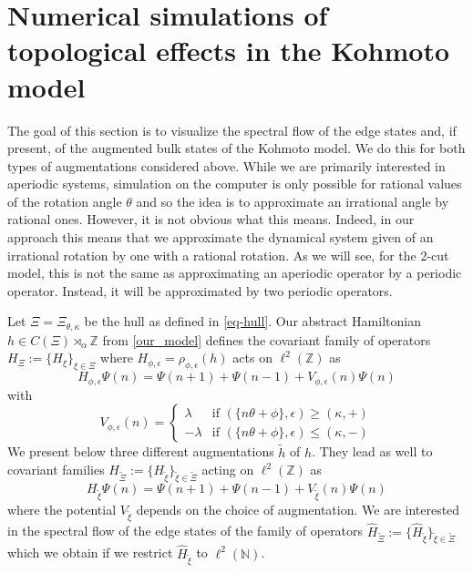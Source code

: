 \documentclass[11pt]{amsart}
\newcommand{\Z}{\mathbb{Z}}
\newcommand{\N}{\mathbb{N}}
\newcommand{\cut}{\kappa}
\begin{document}
\section{Numerical simulations of topological effects in the Kohmoto model}
\label{numerical_simulations}
The goal of this section is to visualize the spectral flow of the edge states and, if present, of the augmented bulk states of the Kohmoto model. We do this for both types of augmentations considered above. While we are primarily interested in aperiodic systems, simulation on the computer is only possible for rational values of the rotation angle $\theta$ 
and so the idea is to approximate an irrational angle by rational ones. However, it is not obvious what this means. Indeed, in our approach this means that we approximate the dynamical system given of an irrational rotation by one with a rational rotation. As we will see, for the 2-cut model, this is not the same as approximating an aperiodic operator by a periodic operator. Instead, it will be approximated by two periodic operators.
 
Let $\Xi = \Xi_{\theta,\cut}$ be the hull as defined in \eqref{eq-hull}. Our abstract Hamiltonian $h\in C(\Xi)\rtimes_\alpha\Z$ from \eqref{our_model} 
defines the covariant family of operators
$H_\Xi := \{H_\xi\}_{\xi\in\Xi}$ where 
$H_{\phi,\epsilon} =\rho_{\phi,\epsilon}(h)$ acts on $\ell^2(\Z)$ as 
$$H_{\phi,\epsilon} \Psi(n)=\Psi(n+1)+\Psi(n-1)+V_{\phi,\epsilon}(n) \Psi(n)$$
with 
\begin{equation}%
	V_{\phi,\epsilon}(n) = \left\{\begin{array}{ll}
\lambda & \mbox{if } (\{n\theta+\phi\},\epsilon) \geq (\cut,+) \\
-\lambda & \mbox{if } (\{n\theta+\phi\},\epsilon) \leq (\cut,-)
\end{array}\right.
\end{equation}
We present below three different augmentations $\tilde h$ of $h$. They lead as well to covariant families 
$H_{\tilde \Xi}:= \{H_{\tilde\xi}\}_{\tilde\xi\in\tilde\Xi}$ acting on  $\ell^2(\Z)$ as 
$$H_{\tilde\xi} \Psi(n)=\Psi(n+1)+\Psi(n-1)+V_{\tilde \xi}(n) \Psi(n)$$
where the potential $V_{\tilde \xi}$ depends on the choice of augmentation.
We are interested in the spectral flow of the edge states of the family of operators $\hat H_{\tilde \Xi} := \{\hat H_{\tilde\xi}\}_{\tilde\xi\in\tilde\Xi}$ which we obtain if we restrict $\hat H_{\tilde\xi}$ to $\ell^2(\N)$. 
\end{document}
